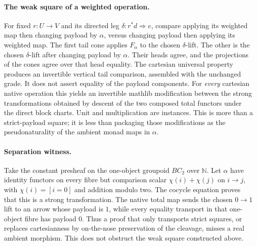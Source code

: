\documentclass[11pt]{article}
\begin{document}
\paragraph{The weak square of a weighted operation.}
For fixed $r:U\to V$ and its directed leg $\delta:r^*d\Rightarrow e$, compare applying its weighted map then changing payload by $\alpha$, versus changing payload then applying its weighted map. The first tail cone applies $F_\alpha$ to the chosen $\delta$-lift. The other is the chosen $\delta$-lift after changing payload by $\alpha$. Their heads agree, and the projections of the cones agree over that head equality. The cartesian universal property produces an invertible vertical tail comparison, assembled with the unchanged grade. It does not assert equality of the payload components. For \emph{every} cartesian native operation this yields an invertible mathlib modification between the strong transformations obtained by descent of the two composed total functors under the direct block charts. Unit and multiplication are instances. This is more than a strict-payload square; it is less than packaging those modifications as the pseudonaturality of the ambient monad maps in $\alpha$.
\paragraph{Separation witness.}
Take the constant presheaf on the one-object groupoid $BC_2$ over $\mathbb N$. Let $\alpha$ have identity functors on every fibre but comparison scalar $\chi(i)+\chi(j)$ on $i\to j$, with $\chi(i)=[i=0]$ and addition modulo two. The cocycle equation proves that this is a strong transformation. The native total map sends the chosen $0\to1$ lift to an arrow whose payload is $1$, while every equality transport in that one-object fibre has payload $0$. Thus a proof that only transports strict squares, or replaces cartesianness by on-the-nose preservation of the cleavage, misses a real ambient morphism. This does not obstruct the weak square constructed above.
\end{document}
